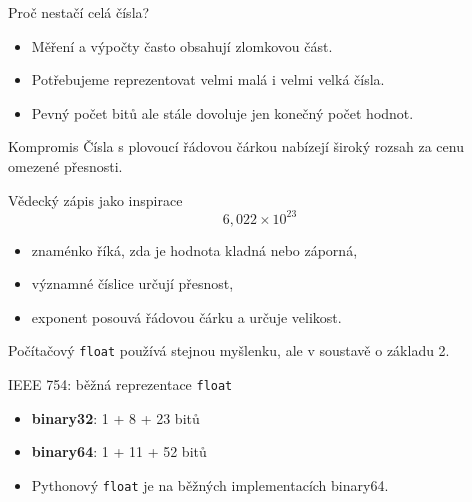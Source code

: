 \documentclass[aspectratio=169]{beamer}
\newcommand{\term}[1]{\textcolor{CodeBlue}{\textbf{#1}}}
\begin{document}
\begin{frame}{Proč nestačí celá čísla?}
  \begin{itemize}
    \item Měření a výpočty často obsahují zlomkovou část.
    \item Potřebujeme reprezentovat velmi malá i velmi velká čísla.
    \item Pevný počet bitů ale stále dovoluje jen konečný počet hodnot.
  \end{itemize}
  \begin{block}{Kompromis}
    Čísla s plovoucí řádovou čárkou nabízejí široký rozsah za cenu omezené přesnosti.
  \end{block}
\end{frame}

\begin{frame}{Vědecký zápis jako inspirace}
  \[
    6{,}022\times10^{23}
  \]
  \begin{itemize}
    \item znaménko říká, zda je hodnota kladná nebo záporná,
    \item významné číslice určují přesnost,
    \item exponent posouvá řádovou čárku a určuje velikost.
  \end{itemize}
  \vspace{3mm}
  Počítačový \texttt{float} používá stejnou myšlenku, ale v soustavě o základu 2.
\end{frame}

\begin{frame}{IEEE 754: běžná reprezentace \texttt{float}}
  \centering
  \vspace{6mm}
  \begin{itemize}
    \item \term{binary32}: 1 + 8 + 23 bitů
    \item \term{binary64}: 1 + 11 + 52 bitů
    \item Pythonový \texttt{float} je na běžných implementacích binary64.
  \end{itemize}
\end{frame}
\end{document}
